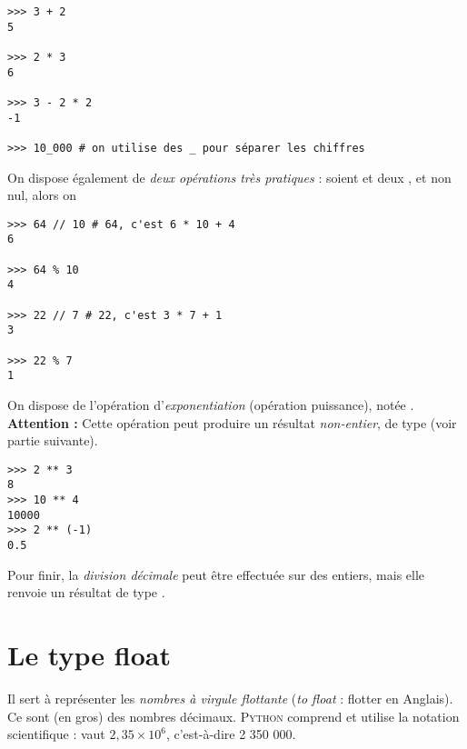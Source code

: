 \begin{pys}\begin{verbatim}
>>> 3 + 2
5

>>> 2 * 3
6

>>> 3 - 2 * 2
-1

>>> 10_000 # on utilise des _ pour séparer les chiffres
\end{verbatim}
\end{pys}

On dispose également de \textit{deux opérations très pratiques} : soient  et  deux , et  non nul, alors on 


\begin{pys}\begin{verbatim}
>>> 64 // 10 # 64, c'est 6 * 10 + 4
6

>>> 64 % 10
4

>>> 22 // 7 # 22, c'est 3 * 7 + 1
3

>>> 22 % 7
1
\end{verbatim}
\end{pys}


On dispose de l'opération d'\textit{exponentiation} (opération puissance), notée \pythoninline{**}.\\
\textbf{Attention :} Cette opération peut produire un résultat \textit{non-entier}, de type  (voir partie suivante).

\begin{pys}\begin{verbatim}
>>> 2 ** 3
8
>>> 10 ** 4
10000
>>> 2 ** (-1)
0.5
\end{verbatim}
\end{pys}

Pour finir, la \textit{division décimale} peut être effectuée sur des entiers, mais elle renvoie un résultat de type .

\section{Le type float}
Il sert à représenter les \textit{nombres à virgule flottante} (\textit{to float} : flotter en Anglais). Ce sont (en gros) des nombres
décimaux. \textsc{Python} comprend et utilise la notation scientifique :  vaut $2,35\times 10^6$, c'est-à-dire 2 350 000.

